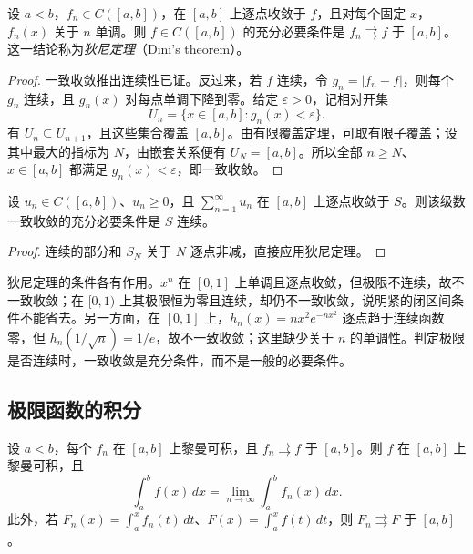 \documentclass[UTF8,12pt,a4paper,fontset=fandol]{ctexbook}
\begin{document}
\begin{theorem}[狄尼定理]
\label{thm:dini-uniform-convergence}
设 $a<b$，$f_n\in C([a,b])$，在 $[a,b]$ 上逐点收敛于 $f$，且对每个固定 $x$，$f_n(x)$ 关于 $n$ 单调。则 $f\in C([a,b])$ 的充分必要条件是 $f_n\rightrightarrows f$ 于 $[a,b]$。这一结论称为\emph{狄尼定理}（Dini's theorem）。
\end{theorem}

\begin{proof}
一致收敛推出连续性已证。反过来，若 $f$ 连续，令 $g_n=|f_n-f|$，则每个 $g_n$ 连续，且 $g_n(x)$ 对每点单调下降到零。给定 $\varepsilon>0$，记相对开集
\[
    U_n=\{x\in[a,b]:g_n(x)<\varepsilon\}.
\]
有 $U_n\subseteq U_{n+1}$，且这些集合覆盖 $[a,b]$。由有限覆盖定理，可取有限子覆盖；设其中最大的指标为 $N$，由嵌套关系便有 $U_N=[a,b]$。所以全部 $n\geq N$、$x\in[a,b]$ 都满足 $g_n(x)<\varepsilon$，即一致收敛。
\end{proof}

\begin{corollary}[非负项级数的狄尼定理]
\label{cor:dini-nonnegative-function-series}
设 $u_n\in C([a,b])$、$u_n\geq0$，且 $\sum_{n=1}^\infty u_n$ 在 $[a,b]$ 上逐点收敛于 $S$。则该级数一致收敛的充分必要条件是 $S$ 连续。
\end{corollary}

\begin{proof}
连续的部分和 $S_N$ 关于 $N$ 逐点非减，直接应用狄尼定理。
\end{proof}

狄尼定理的条件各有作用。$x^n$ 在 $[0,1]$ 上单调且逐点收敛，但极限不连续，故不一致收敛；在 $[0,1)$ 上其极限恒为零且连续，却仍不一致收敛，说明紧的闭区间条件不能省去。另一方面，在 $[0,1]$ 上，$h_n(x)=nx^2e^{-nx^2}$ 逐点趋于连续函数零，但 $h_n(1/\sqrt n)=1/e$，故不一致收敛；这里缺少关于 $n$ 的单调性。判定极限是否连续时，一致收敛是充分条件，而不是一般的必要条件。

\subsection{极限函数的积分}
\label{subsec:integration-of-limit-functions}

\begin{theorem}[一致极限的可积性与积分极限]
\label{thm:integration-of-uniform-limit}
设 $a<b$，每个 $f_n$ 在 $[a,b]$ 上黎曼可积，且 $f_n\rightrightarrows f$ 于 $[a,b]$。则 $f$ 在 $[a,b]$ 上黎曼可积，且
\begin{equation}
    \int_a^bf(x)\,dx
       =\lim_{n\to\infty}\int_a^bf_n(x)\,dx.
    \label{eq:uniform-limit-integration}
\end{equation}
此外，若 $F_n(x)=\int_a^xf_n(t)\,dt$、$F(x)=\int_a^xf(t)\,dt$，则 $F_n\rightrightarrows F$ 于 $[a,b]$。
\end{theorem}
\end{document}
